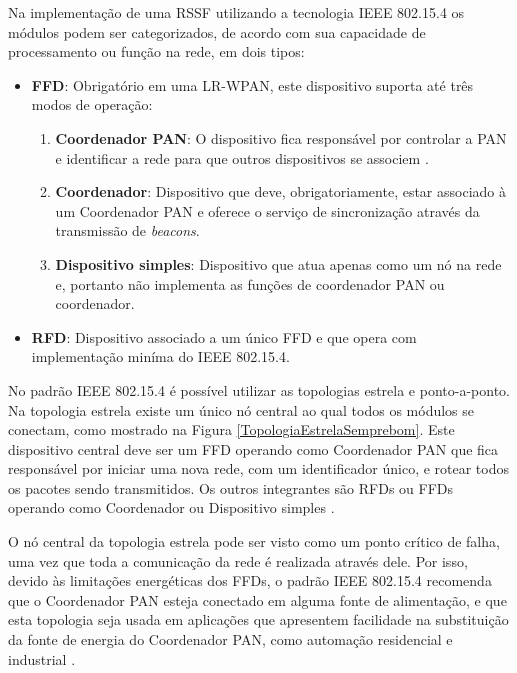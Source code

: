 Na implementação de uma \ac{RSSF} utilizando a tecnologia IEEE 802.15.4 os módulos podem ser categorizados, de acordo com sua capacidade de processamento ou função na rede, em dois tipos:

\begin{itemize}
  \item \textbf{\ac{FFD}}: Obrigatório em uma \ac{LR-WPAN}, este dispositivo suporta até três modos de operação:
  \begin{enumerate}
     \item \textbf{Coordenador PAN}: O dispositivo fica responsável por controlar a \ac{PAN} e identificar a rede para que outros dispositivos se associem \cite{BONOTTO}. 
     \item \textbf{Coordenador}: Dispositivo que deve, obrigatoriamente, estar associado à um Coordenador \ac{PAN} e oferece o serviço de sincronização através da transmissão de \textit{beacons}.
     \item \textbf{Dispositivo simples}: Dispositivo que atua apenas como um nó na rede e, portanto não implementa as funções de coordenador \ac{PAN} ou coordenador.
  \end{enumerate}
\end{itemize}

\begin{itemize}
  \item \textbf{\ac{RFD}}: Dispositivo associado a um único \ac{FFD} e que opera com implementação miníma do IEEE 802.15.4.
\end{itemize}

No padrão IEEE 802.15.4 é possível utilizar as topologias estrela e ponto-a-ponto. Na topologia estrela existe um único nó central ao qual todos os módulos se conectam, como mostrado na Figura \ref{TopologiaEstrelaSemprebom}. Este dispositivo central deve ser um \ac{FFD} operando como Coordenador \ac{PAN} que fica responsável por iniciar uma nova rede, com um identificador único, e rotear todos os pacotes sendo transmitidos. Os outros integrantes são \ac{RFD}s ou \ac{FFD}s operando como Coordenador ou Dispositivo simples \cite{SEMPREBOM}. 

O nó central da topologia estrela pode ser visto como um ponto crítico de falha, uma vez que toda a comunicação da rede é realizada através dele. Por isso, devido às limitações energéticas dos \ac{FFD}s, o padrão IEEE 802.15.4 recomenda que o Coordenador \ac{PAN} esteja conectado em alguma fonte de alimentação, e que esta topologia seja usada em aplicações que apresentem facilidade na substituição da fonte de energia do Coordenador \ac{PAN}, como automação residencial e industrial  \cite{BONOTTO}.

